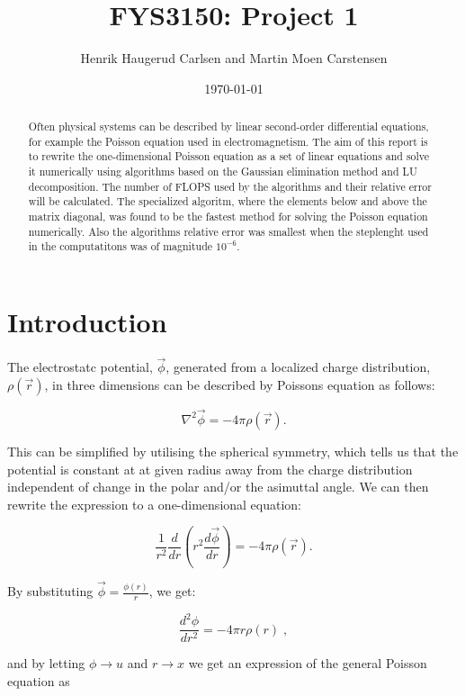 \documentclass[english,a4paper, 11pt]{article}
\title{FYS3150: Project 1}
\author{Henrik Haugerud Carlsen and Martin Moen Carstensen}
\date{\today}
\begin{document}
\maketitle

\begin{abstract}
\centering
Often physical systems can be described by linear second-order differential equations, for example the Poisson equation used in electromagnetism. The aim of this report is to rewrite the one-dimensional Poisson equation as a set of linear equations and solve it numerically using algorithms based on the Gaussian elimination method and LU decomposition. The number of FLOPS used by the algorithms and their relative error will be calculated. 
The specialized algoritm, where the elements below and above the matrix diagonal, was found to be the fastest method for solving the Poisson equation numerically. Also the algorithms relative error was smallest when the steplenght used in the computatitons was of magnitude $10^{-6}$.
\end{abstract}


\section{Introduction}
The electrostatc potential, $\vec{\phi}$, generated from a localized charge distribution, $\rho(\vec{r})$, in three dimensions can be described by Poissons equation as follows:

\begin{equation}
\nabla^2 \vec{\phi} = -4\pi \rho(\vec{r}).
\label{eq1}
\end{equation}

This can be simplified by utilising the spherical symmetry, which tells us that the potential is constant at at given radius away from the charge distribution independent of change in the polar and/or the asimuttal angle. We can then rewrite the expression to a one-dimensional equation:

\begin{equation}
\frac{1}{r^2} \frac{d}{dr} (r^2\frac{d \vec{\phi}}{dr}) = -4\pi\rho(\vec{r}).
\label{eq2}
\end{equation}

By substituting $\vec{\phi} = \frac{\phi(r)}{r}$, we get:

\begin{equation}
\frac{d^2 \phi}{dr^2} = -4 \pi r \rho(r) \;,
\label{eq3}
\end{equation}

and by letting $\phi \rightarrow u$ and $r \rightarrow x$ we get an expression of the general Poisson equation as
\end{document}
